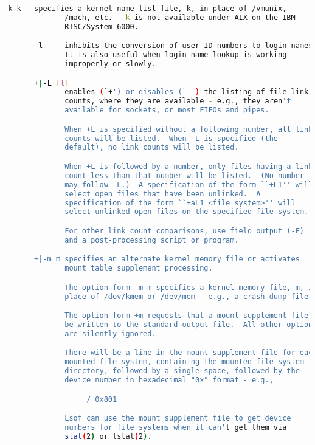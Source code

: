 {{\begin{lstlisting}[language=bash]
       -k k   specifies a kernel name list file, k, in place of /vmunix,
              /mach, etc.  -k is not available under AIX on the IBM
              RISC/System 6000.

       -l     inhibits the conversion of user ID numbers to login names.
              It is also useful when login name lookup is working
              improperly or slowly.

       +|-L [l]
              enables (`+') or disables (`-') the listing of file link
              counts, where they are available - e.g., they aren't
              available for sockets, or most FIFOs and pipes.

              When +L is specified without a following number, all link
              counts will be listed.  When -L is specified (the
              default), no link counts will be listed.

              When +L is followed by a number, only files having a link
              count less than that number will be listed.  (No number
              may follow -L.)  A specification of the form ``+L1'' will
              select open files that have been unlinked.  A
              specification of the form ``+aL1 <file_system>'' will
              select unlinked open files on the specified file system.

              For other link count comparisons, use field output (-F)
              and a post-processing script or program.

       +|-m m specifies an alternate kernel memory file or activates
              mount table supplement processing.

              The option form -m m specifies a kernel memory file, m, in
              place of /dev/kmem or /dev/mem - e.g., a crash dump file.

              The option form +m requests that a mount supplement file
              be written to the standard output file.  All other options
              are silently ignored.

              There will be a line in the mount supplement file for each
              mounted file system, containing the mounted file system
              directory, followed by a single space, followed by the
              device number in hexadecimal "0x" format - e.g.,

                   / 0x801

              Lsof can use the mount supplement file to get device
              numbers for file systems when it can't get them via
              stat(2) or lstat(2).


\end{lstlisting}}}
